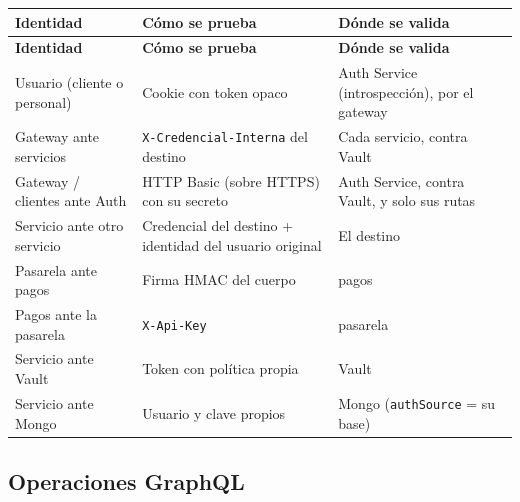 {\small
\setlength{\tabcolsep}{3pt}\renewcommand{\arraystretch}{1.15}
\begin{longtable}{|>{\raggedright\arraybackslash}p{}|>{\raggedright\arraybackslash}p{}|>{\raggedright\arraybackslash}p{}|}
\hline
\textbf{Identidad} & \textbf{Cómo se prueba} & \textbf{Dónde se valida} \\ \hline
\endfirsthead
\hline
\textbf{Identidad} & \textbf{Cómo se prueba} & \textbf{Dónde se valida} \\ \hline
\endhead
Usuario (cliente o personal) & Cookie con token opaco & Auth Service (introspección), por el gateway \\ \hline
Gateway ante servicios & \texttt{X-\allowbreak{}Credencial-\allowbreak{}Interna} del destino & Cada servicio, contra Vault \\ \hline
Gateway / clientes ante Auth & HTTP Basic (sobre HTTPS) con su secreto & Auth Service, contra Vault, y solo sus rutas \\ \hline
Servicio ante otro servicio & Credencial del destino + identidad del usuario original & El destino \\ \hline
Pasarela ante pagos & Firma HMAC del cuerpo & pagos \\ \hline
Pagos ante la pasarela & \texttt{X-\allowbreak{}Api-\allowbreak{}Key} & pasarela \\ \hline
Servicio ante Vault & Token con política propia & Vault \\ \hline
Servicio ante Mongo & Usuario y clave propios & Mongo (\texttt{authSource} = su base) \\ \hline
\end{longtable}
}

\subsection{Operaciones GraphQL}

